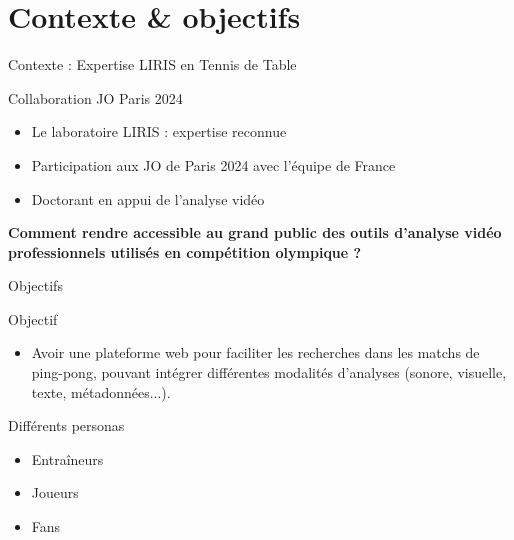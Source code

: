 \documentclass[aspectratio=169, 11pt]{beamer}
\begin{document}
\section{Contexte \& objectifs}
\begin{frame}{Contexte : Expertise LIRIS en Tennis de Table}
    \begin{block}{Collaboration JO Paris 2024}
        \begin{itemize}\large
            \item Le laboratoire LIRIS : expertise reconnue
            \item Participation aux JO de Paris 2024 avec l'équipe de France
            \item Doctorant en appui de l'analyse vidéo
        \end{itemize}
        
        \vspace{0.8cm}
        \begin{center}
            \large\textbf{Comment rendre accessible au grand public des outils d'analyse vidéo\\
            professionnels utilisés en compétition olympique ?}
        \end{center}
    \end{block}
\end{frame}

\begin{frame}{Objectifs}
    \begin{block}{Objectif}
        \begin{itemize}\large
            \item Avoir une plateforme web pour faciliter les recherches dans les matchs de ping-pong,
            pouvant intégrer différentes modalités d’analyses (sonore, visuelle, texte, métadonnées...).
        \end{itemize}
    \end{block}

    \vspace{0.4cm}
    \begin{block}{Différents personas}
        \begin{itemize}\large
            \item Entraîneurs
            \item Joueurs
            \item Fans
        \end{itemize}
    \end{block}
\end{frame}
\end{document}
